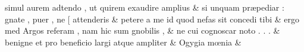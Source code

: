 \documentclass[12pt,onecolumn,twoside,a4paper]{memoir}
\begin{document}
\begin{pairs}
\begin{Leftside}
                              simul
                              aurem
                              adtendo
                              ,
                              ut
                              quirem
                              exaudire
                              amplius \&
                         \stanza {}si
                              unquam
                              præpediar
                              :
                              gnate
                              ,
                              puer
                              ,
                              ne
                              [
                              attenderis & 
                     petere
                              a
                              me
                              id
                              quod
                              nefas
                              sit
                              concedi
                              tibi \&
                         \stanza {}ergo
                              med
                              Argos
                              referam
                              ,
                              nam
                              hic
                              sum
                              gnobilis
                              , & 
                     ne
                              cui
                              cognoscar
                              noto
                              .
                              .
                              . \&
                         \stanza {}
                     benigne
                              et
                              pro
                              beneficio
                              largi
                              atque
                              ampliter \&
                         \stanza {}
                     Ogygia
                              mœnia \&

                     
                  \endnumbering
		\end{Leftside}
                  \begin{Rightside}
			\beginnumbering
			\numberstanzafalse
                     

\end{Rightside}
\end{pairs}
\end{document}
